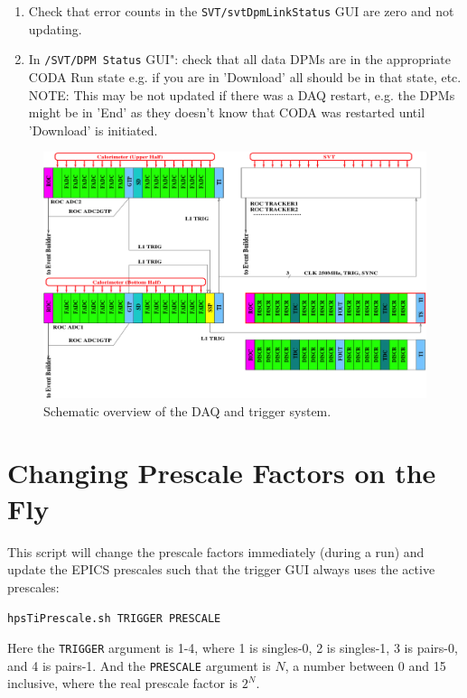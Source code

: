 \documentclass[12pt]{article}
\begin{document}
\begin{enumerate}
\begin{enumerate}
\item
Check that error counts in the \texttt{SVT/svtDpmLinkStatus} GUI are zero and not updating.

\item
In \texttt{/SVT/DPM Status} GUI": check that all data DPMs are in the appropriate CODA Run state e.g. if you are in 'Download' all should be in that state, etc. 
\newline NOTE: This may be not updated if there was a DAQ restart, e.g. the DPMs might be in 'End' as they doesn't know that CODA was restarted until 'Download' is initiated.
\end{enumerate}
\end{enumerate}




\begin{figure}[htbp]
\begin{center}
    \includegraphics[width=\textwidth]{daq.png}
\caption{Schematic overview of the DAQ and trigger system.}
\label{fig:daq}
\end{center}
\end{figure}

\newpage

\appendix
\section{Changing Prescale Factors on the Fly}
This script will change the prescale factors immediately (during a run) and update the EPICS prescales such that the trigger GUI always uses the active prescales:\newline
\centerline{\texttt{hpsTiPrescale.sh TRIGGER PRESCALE}}
Here the \texttt{TRIGGER} argument is 1-4, where 1 is singles-0, 2 is singles-1, 3 is pairs-0, and 4 is pairs-1.
And the \texttt{PRESCALE} argument is $N$, a number between 0 and 15 inclusive, where the real prescale factor is $2^N$.
\end{document}
